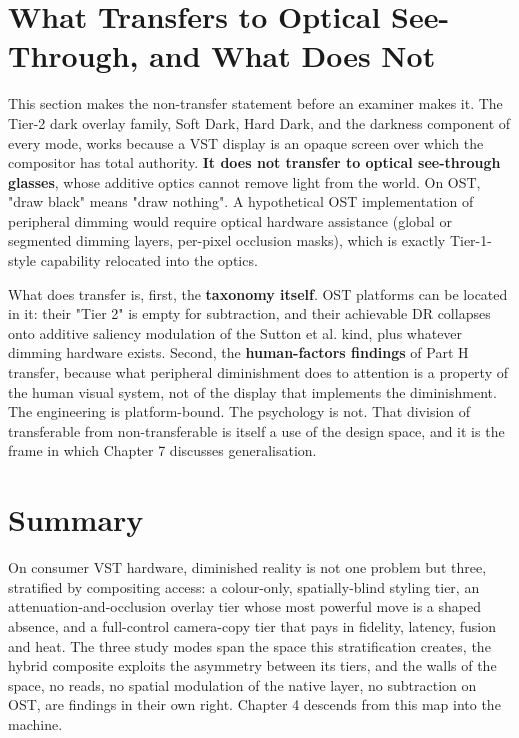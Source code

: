 \section{What Transfers to Optical See-Through, and What Does Not}

This section makes the non-transfer statement before an examiner makes it. The Tier-2 dark overlay
family, Soft Dark, Hard Dark, and the darkness component of every mode, works because a VST display
is an opaque screen over which the compositor has total authority. \textbf{It does not transfer to optical
see-through glasses}, whose additive optics cannot remove light from the world. On OST, "draw black"
means "draw nothing". A hypothetical OST implementation of peripheral dimming would require optical
hardware assistance (global or segmented dimming layers, per-pixel occlusion masks), which is exactly
Tier-1-style capability relocated into the optics.

What does transfer is, first, the \textbf{taxonomy itself}. OST platforms can be located in it: their
"Tier 2" is empty for subtraction, and their achievable DR collapses onto additive saliency modulation
of the Sutton et al. kind, plus whatever dimming hardware exists. Second, the \textbf{human-factors
findings} of Part H transfer, because what peripheral diminishment does to attention is a property of
the human visual system, not of the display that implements the diminishment. The engineering is
platform-bound. The psychology is not. That division of transferable from non-transferable is itself
a use of the design space, and it is the frame in which Chapter 7 discusses generalisation.

\section{Summary}

On consumer VST hardware, diminished reality is not one problem but three, stratified by compositing
access: a colour-only, spatially-blind styling tier, an attenuation-and-occlusion overlay tier whose
most powerful move is a shaped absence, and a full-control camera-copy tier that pays in fidelity,
latency, fusion and heat. The three study modes span the space this stratification creates, the
hybrid composite exploits the asymmetry between its tiers, and the walls of the space, no reads, no
spatial modulation of the native layer, no subtraction on OST, are findings in their own right.
Chapter 4 descends from this map into the machine.

